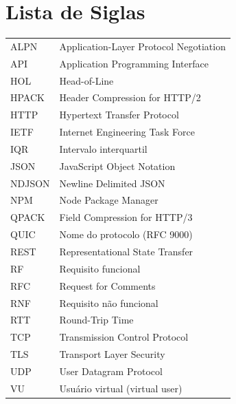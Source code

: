 \listoffigures
\clearpage
\listoftables
\clearpage
\chapter*{Lista de Siglas}

\begin{tabular}{@{}ll@{}}
ALPN & Application-Layer Protocol Negotiation \\
API & Application Programming Interface \\
HOL & Head-of-Line \\
HPACK & Header Compression for HTTP/2 \\
HTTP & Hypertext Transfer Protocol \\
IETF & Internet Engineering Task Force \\
IQR & Intervalo interquartil \\
JSON & JavaScript Object Notation \\
NDJSON & Newline Delimited JSON \\
NPM & Node Package Manager \\
QPACK & Field Compression for HTTP/3 \\
QUIC & Nome do protocolo (RFC 9000) \\
REST & Representational State Transfer \\
RF & Requisito funcional \\
RFC & Request for Comments \\
RNF & Requisito não funcional \\
RTT & Round-Trip Time \\
TCP & Transmission Control Protocol \\
TLS & Transport Layer Security \\
UDP & User Datagram Protocol \\
VU & Usuário virtual (virtual user) \\
\end{tabular}

\clearpage
